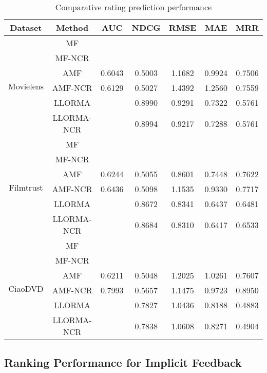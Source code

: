 \documentclass[letterpaper]{article} %
\begin{document}
\begin{table}[htp]
\tiny
\caption{Comparative rating prediction performance}
\begin{center}
\begin{tabular}{|c|c|c|c|c|c|c|}
\hline
Dataset & Method & AUC & NDCG & RMSE & MAE & MRR \\\hline
\multirow{6}{*}{Movielens} & MF & & & & & \\\cline{2-7}
 & MF-NCR & & & & & \\\cline{2-7}
 & AMF &0.6043 &0.5003 &1.1682 &0.9924 &0.7506 \\\cline{2-7}
 & AMF-NCR &0.6129 &0.5027 &1.4392 &1.2560 &0.7559 \\\cline{2-7}
 & LLORMA & &0.8990 &0.9291 &0.7322 &0.5761 \\\cline{2-7}
 & LLORMA-NCR & &0.8994 &0.9217 &0.7288 &0.5761 \\\hline
\multirow{6}{*}{Filmtrust} & MF & & & & & \\\cline{2-7}
 & MF-NCR & & & & & \\\cline{2-7}
 & AMF &0.6244 &0.5055 &0.8601 &0.7448 &0.7622 \\\cline{2-7}
 & AMF-NCR &0.6436 &0.5098 &1.1535 &0.9330 &0.7717 \\\cline{2-7}
 & LLORMA & &0.8672 &0.8341 &0.6437 &0.6481 \\\cline{2-7}
 & LLORMA-NCR & &0.8684 &0.8310 &0.6417 &0.6533 \\\hline
 \multirow{6}{*}{CiaoDVD} & MF & & & & & \\\cline{2-7}
 & MF-NCR & & & & & \\\cline{2-7}
 & AMF &0.6211 &0.5048 &1.2025 &1.0261 &0.7607\\\cline{2-7}
 & AMF-NCR &0.7993 &0.5657 &1.1475 &0.9723 &0.8950 \\\cline{2-7}
 & LLORMA & &0.7827 &1.0436 &0.8188 &0.4883 \\\cline{2-7}
 & LLORMA-NCR & &0.7838 &1.0608 &0.8271 &0.4904 \\\hline
\end{tabular}
\end{center}
\label{tab:ratingresult}
\end{table}%

\subsection{Ranking Performance for Implicit Feedback }
\end{document}
